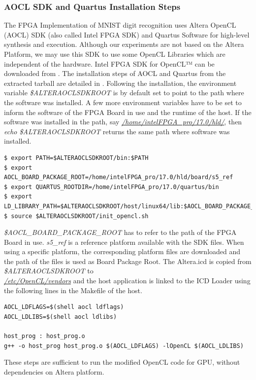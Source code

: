 \subsubsection*{AOCL SDK and Quartus Installation Steps}
The FPGA Implementation of MNIST digit recognition \cite{mnist-altera-opencl} uses Altera OpenCL (AOCL) SDK (also called Intel FPGA SDK) and Quartus Software for high-level synthesis and execution. Although our experiments are not based on the Altera Platform, we may use this SDK to use some OpenCL Libraries which are independent of the hardware.\newline \newline
Intel FPGA SDK for OpenCL™ can be downloaded from \cite{opencl_fpga_sdk}. The installation steps of AOCL and Quartus from the extracted tarball are detailed in \cite{intel_fpga_guide}. Following the installation, the environment variable \textit{\$ALTERAOCLSDKROOT} is by default set to point to the path where the software was installed. A few more environment variables have to be set to inform the software of the FPGA Board in use and the runtime of the host. If the software was installed in the path, say \underline{\textit{/home/intelFPGA\_pro/17.0/hld/}}, then \textit{echo \$ALTERAOCLSDKROOT} returns the same path where software was installed. 
\begin{scriptsize}
\linuxbash
\begin{lstlisting}
$ export PATH=$ALTERAOCLSDKROOT/bin:$PATH
$ export AOCL_BOARD_PACKAGE_ROOT=/home/intelFPGA_pro/17.0/hld/board/s5_ref
$ export QUARTUS_ROOTDIR=/home/intelFPGA_pro/17.0/quartus/bin
$ export LD_LIBRARY_PATH=$ALTERAOCLSDKROOT/host/linux64/lib:$AOCL_BOARD_PACKAGE_ROOT/linux64/lib:/usr/local/lib:$LD_LIBRARY_PATH
$ source $ALTERAOCLSDKROOT/init_opencl.sh
\end{lstlisting}
\end{scriptsize}
\textit{\$AOCL\_BOARD\_PACKAGE\_ROOT} has to refer to the path of the FPGA Board in use. \textit{s5\_ref} is a reference platform available with the SDK files. When using a specific platform, the corresponding platform files are downloaded and the path of the files is used as Board Package Root. \newline \newline
The Altera.icd is copied from \textit{\$ALTERAOCLSDKROOT} to\\ \underline{\textit{/etc/OpenCL/vendors}} and the host application is linked to the ICD Loader using the following lines in the Makefile of the host.
\begin{scriptsize}
\linuxbash
\begin{lstlisting}
AOCL_LDFLAGS=$(shell aocl ldflags)
AOCL_LDLIBS=$(shell aocl ldlibs)

host_prog : host_prog.o
g++ -o host_prog host_prog.o $(AOCL_LDFLAGS) -lOpenCL $(AOCL_LDLIBS)
\end{lstlisting}
\end{scriptsize}
These steps are sufficient to run the modified OpenCL code for GPU, without dependencies on Altera platform.
